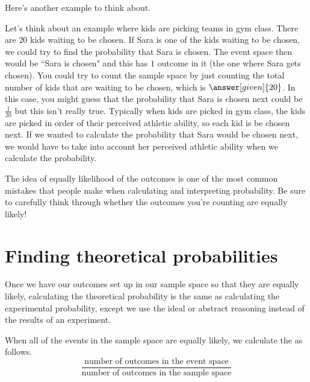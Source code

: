 \documentclass{ximera}
\begin{document}
Here's another example to think about.
\begin{example}
Let's think about an example where kids are picking teams in gym class. There are $20$ kids waiting to be chosen. If Sara is one of the kids waiting to be chosen, we could try to find the probability that Sara is chosen. The event space then would be ``Sara is chosen" and this has $1$ outcome in it (the one where Sara gets chosen). You could try to count the sample space by just counting the total number of kids that are waiting to be chosen, which is $\answer[given]{20}$. In this case, you might guess that the probability that Sara is chosen next could be $\frac{1}{20}$ but this isn't really true. Typically when kids are picked in gym class, the kids are picked in order of their perceived athletic ability, so each kid is   be chosen next. If we wanted to calculate the probability that Sara would be chosen next, we would have to take into account her perceived athletic ability when we calculate the probability.
\end{example}

The idea of equally likelihood of the outcomes is one of the most common mistakes that people make when calculating and interpreting probability. Be sure to carefully think through whether the outcomes you're counting are equally likely!


\section{Finding theoretical probabilities}
Once we have our outcomes set up in our sample space so that they are equally likely, calculating the theoretical probability is the same as calculating the experimental probability, except we use the ideal or abstract reasoning instead of the results of an experiment.
\begin{theorem}
When all of the events in the sample space are equally likely, we calculate the  as follows.
\[
\frac{\textrm{number of outcomes in the event space}}{\textrm{number of outcomes in the sample space}}
\]
\end{theorem}
\end{document}
